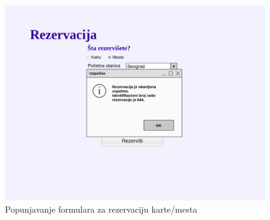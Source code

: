\begin{description}
\begin{figure}[h!tb]
	\includegraphics[width=1.2\linewidth]{../Slike/Veb/rezervacijapopup.png}
	\caption{Popunjavanje formulara za rezervaciju karte/mesta}
	\label{fig:rezpopup}
\end{figure}

\end{description}
\newpage
